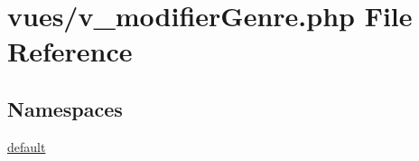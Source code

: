 \hypertarget{v__modifier_genre_8php}{}\section{vues/v\+\_\+modifier\+Genre.php File Reference}
\label{v__modifier_genre_8php}
\subsection*{Namespaces}
\begin{DoxyCompactItemize}
\item 
 \hyperlink{namespacedefault}{default}
\end{DoxyCompactItemize}
